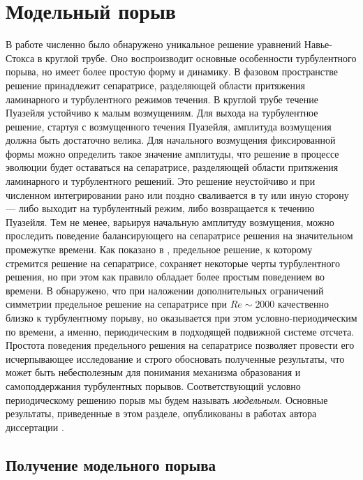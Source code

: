 
\chapter{Модельный порыв}


В работе \cite{Avila2013} численно было обнаружено уникальное решение уравнений Навье-Стокса в круглой трубе. Оно воспроизводит основные особенности турбулентного порыва, но имеет более простую форму и динамику. В фазовом пространстве решение \cite{Avila2013} принадлежит сепаратрисе, разделяющей области притяжения ламинарного и турбулентного режимов течения. В круглой трубе течение Пуазейля устойчиво к малым возмущениям. Для выхода на турбулентное решение, стартуя с возмущенного течения Пуазейля, амплитуда возмущения должна быть достаточно велика. Для начального возмущения фиксированной формы можно определить такое значение амплитуды, что решение в процессе эволюции будет оставаться на сепаратрисе, разделяющей области притяжения ламинарного и турбулентного решений. Это решение неустойчиво и при численном интегрировании рано или поздно сваливается в ту или иную сторону --- либо выходит на турбулентный режим, либо возвращается к течению Пуазейля. Тем не менее, варьируя начальную амплитуду возмущения, можно проследить поведение балансирующего на сепаратрисе решения на значительном промежутке времени. Как показано в \cite{Skufca2006}, предельное решение, к которому стремится решение на сепаратрисе, сохраняет некоторые черты турбулентного решения, но при этом как правило обладает более простым поведением во времени. В \cite{Avila2013} обнаружено, что при наложении дополнительных ограничений симметрии предельное решение на сепаратрисе при $Re\sim2000$ качественно близко к турбулентному порыву, но оказывается при этом условно-периодическим по времени, а именно, периодическим в подходящей подвижной системе отсчета. Простота поведения предельного решения на сепаратрисе позволяет провести его исчерпывающее исследование и строго обосновать полученные результаты, что может быть небесполезным для понимания  механизма образования и самоподдержания турбулентных порывов. Соответствующий условно периодическому решению порыв мы будем называть {\it модельным}. Основные результаты, приведенные в этом разделе, опубликованы в работах автора диссертации \cite{MZG2015, Kazan2015}. 


\section{Получение модельного порыва} \label{edge_seq}

